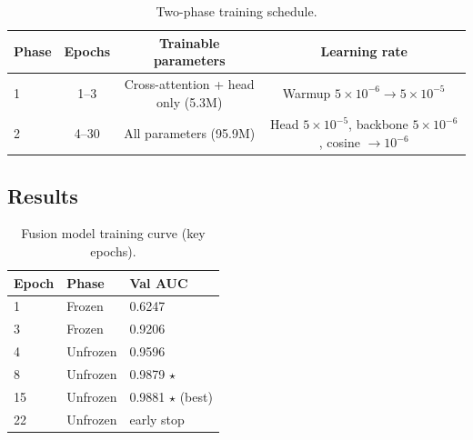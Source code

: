 \documentclass[11pt]{article}
\begin{document}
\begin{table}[H]
\centering
\caption{Two-phase training schedule.}
\begin{tabular}{lccc}
\toprule
Phase & Epochs & Trainable parameters & Learning rate \\
\midrule
1 & 1--3  & Cross-attention + head only (5.3M) & Warmup $5\times10^{-6} \to 5\times10^{-5}$ \\
2 & 4--30 & All parameters (95.9M) & Head $5\times10^{-5}$, backbone $5\times10^{-6}$, cosine $\to 10^{-6}$ \\
\bottomrule
\end{tabular}
\end{table}


\subsection{Results}

\begin{table}[H]
\centering
\caption{Fusion model training curve (key epochs).}
\begin{tabular}{lll}
\toprule
Epoch & Phase & Val AUC \\
\midrule
1  & Frozen   & 0.6247 \\
3  & Frozen   & 0.9206 \\
4  & Unfrozen & 0.9596 \\
8  & Unfrozen & 0.9879 $\star$ \\
15 & Unfrozen & 0.9881 $\star$ (best) \\
22 & Unfrozen & early stop \\
\bottomrule
\end{tabular}
\end{table}
\end{document}
